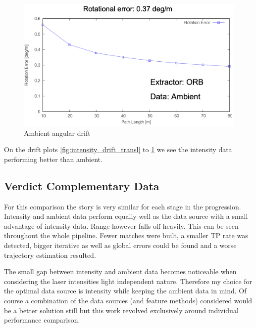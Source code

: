 {{{{            \begin{figure}[!ht]
                \centering
                \includegraphics[scale = 0.45]{images/comparison_appendix/ambient_drift_angle.png}
                \caption{Ambient angular drift}
                \label{fig:ambient_drift_angle}
            \end{figure}

        }
        On the drift plots \cref{fig:intensity_drift_transl} to \cref{fig:ambient_drift_angle} we see the intensity data performing better than ambient.
    }
    \clearpage
    \subsection{Verdict Complementary Data}{

    For this comparison the story is very similar for each stage in the progression. Intensity and ambient data perform equally well as the data source with a small advantage of intensity data. Range however falls off heavily. This can be seen throughout the whole pipeline. Fewer matches were built, a smaller TP rate was detected, bigger iterative as well as global errors could be found and a worse trajectory estimation resulted. 

    \vspace{0.5cm}
    The small gap between intensity and ambient data becomes noticeable when considering the laser intensities light independent nature. Therefore my choice for the optimal data source is intensity while keeping the ambient data in mind. Of course a combination of the data sources (and feature methods) considered would be a better solution still but this work revolved exclusively around individual performance comparison.
    }

}
\clearpage

}
